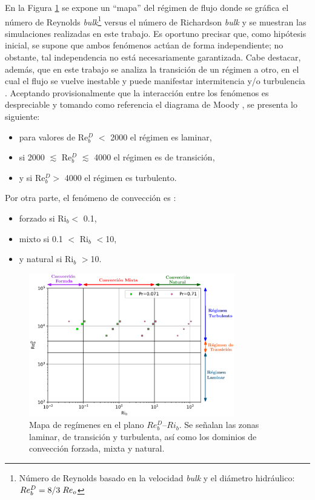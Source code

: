 En la Figura \ref{fig:map_flow_regime} se expone un ``mapa'' del régimen de flujo donde se gráfica el número de Reynolds \textit{bulk}\footnote{Número de Reynolds basado en la velocidad \textit{bulk} y el diámetro hidráulico: $Re^D_b = 8/3 \hspace*{1mm} Re_o$} versus el número de Richardson \textit{bulk} y se muestran las simulaciones realizadas en este trabajo. Es oportuno precisar que, como hipótesis inicial, se supone que ambos fenómenos actúan de forma independiente; no obstante, tal independencia no está necesariamente garantizada. Cabe destacar, además, que en este trabajo se analiza la transición de un régimen a otro, en el cual el flujo se vuelve inestable y puede manifestar intermitencia y/o turbulencia \cite{chen2003direct}. Aceptando provisionalmente que la interacción entre los fenómenos es despreciable y tomando como referencia el diagrama de Moody \cite{white}, se presenta lo siguiente:

\begin{itemize}
	\item para valores de Re$^D_b$ $<$ 2000 el régimen es laminar,
	\item si 2000 $\lesssim$ Re$^D_b$ $\lesssim$ 4000 el régimen es de transición,
	\item y si Re$^D_b>$ 4000 el régimen es turbulento.
\end{itemize}
Por otra parte, el fenómeno de convección es \cite{incropera,cengelheat}:

\begin{itemize}
	\item forzado si Ri$_b<$ 0.1,
	\item mixto si 0.1 $<$ Ri$_b$ $<$10,
	\item y natural si Ri$_b$ $>$10.
\end{itemize}

\begin{figure}[H]
  \centering
    \includegraphics[width=0.8\textwidth]{figures/cap5/map.eps}
  \caption{Mapa de regímenes en el plano $Re^D_b$–$Ri_b$. Se señalan las zonas laminar, de transición y turbulenta, así como los dominios de convección forzada, mixta y natural.}
  \label{fig:map_flow_regime}
\end{figure}

